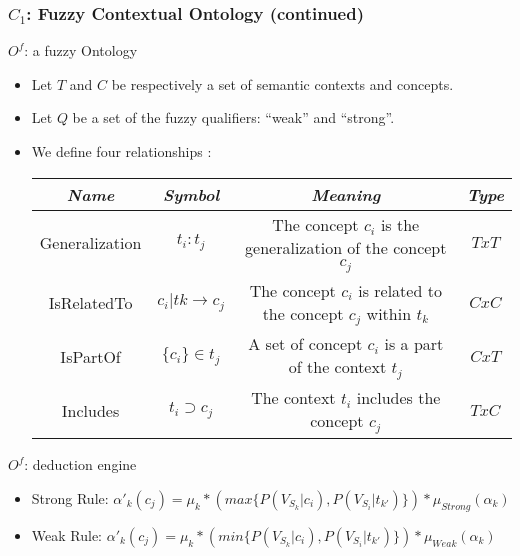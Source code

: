 \begin{frame}
	\frametitle{$C_{1}$: Fuzzy Contextual Ontology (continued)}
	\footnotesize
	\begin{block}{$O^{f}$: a fuzzy Ontology}
		\begin{itemize}
			\item Let $T$ and $C$ be respectively a set of semantic contexts and concepts.
			\item Let $Q$ be a set of the fuzzy qualifiers: \alert{``weak''} and \alert{``strong''}. 
			\item We define four relationships :
			\begin{center} 
							\begin{tiny} 
							\begin{tabular}{c|c|c|c} 
								\hline\textbf{ \textit{Name}} & \textbf{\textit{Symbol}} & 
								\textbf{\textit{Meaning}} & \textbf{\textit{Type}} \\ 
					
								\hline Generalization & $t_{i}:t_{j} $ & 
								The concept $c_{i}$ is the generalization of the concept $c_{j} $ 
				 				&  $TxT$   \\ 
								
								\hline IsRelatedTo 	& $c_{i} |t{k}\rightarrow c_{j}$ &
								The concept $c_{i}$ is related to the concept $c_{j}$ within $t_{k}$ 
				 				& $CxC$  \\ 
					
								\hline IsPartOf 	& $\{c_{i}\} \in t_{j}	$ & 
								A set of concept $c_{i}$ is a part of the context $t_{j}$ 
								& $CxT$ \\ 
					
								\hline Includes 	& $t_{i} \supset c_{j}$	& 
								The context $t_{i}$ includes the concept $c_{j}$ 
				 				&  $TxC$ \\ 
								\hline 
							\end{tabular} 
							\end{tiny} 
							\end{center} 
		 \end{itemize}
	\end{block}
	\begin{block}{$O^{f}$: deduction engine}
		\begin{itemize}
			\item \alert{Strong Rule}: 
				$\alpha'_{k}(c_{j})=\mu_{k}*(max\{P(V_{S_{k}}|c_{i}),P(V_{S_{i}}|t_{k'})\})*\mu_{Strong}(\alpha_{k})$
			\item \alert{Weak Rule}: 
				$\alpha'_{k}(c_{j})=\mu_{k}*(min\{P(V_{S_{k}}|c_{i}),P(V_{S_{i}}|t_{k'})\})*\mu_{Weak}(\alpha_{k})$
		\end{itemize}
	\end{block}
\end{frame}

